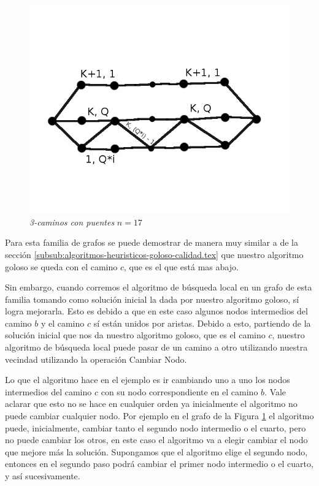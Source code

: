 \begin{figure}[H]
  \begin{center}
    \begin{minipage}{0.5\linewidth}
      \includegraphics[width=\linewidth]{graficos/grafoFamiliaRompe2.png}
      \caption{\emph{3-caminos con puentes} $n=17$}\label{fig:familia-rompe2}
    \end{minipage}
  \end{center}
\end{figure}

Para esta familia de grafos se puede demostrar de manera muy similar a de la sección \ref{subsub:algoritmos-heuristicos-goloso-calidad.tex} que nuestro algoritmo goloso se queda con el camino $c$, que es el que está mas abajo.

Sin embargo, cuando corremos el algoritmo de búsqueda local en un grafo de esta familia tomando como solución inicial la dada por nuestro algoritmo goloso, sí logra mejorarla. Esto es debido a que en este caso algunos nodos intermedios del camino $b$ y el camino $c$ sí están unidos por aristas. Debido a esto, partiendo de la solución inicial que nos da nuestro algoritmo goloso, que es el camino $c$, nuestro algoritmo de búsqueda local puede pasar de un camino a otro utilizando nuestra vecindad utilizando la operación Cambiar Nodo.

Lo que el algoritmo hace en el ejemplo es ir cambiando uno a uno los nodos intermedios del camino $c$ con su nodo correspondiente en el camino $b$. Vale aclarar que esto no se hace en cualquier orden ya inicialmente el algoritmo no puede cambiar cualquier nodo. Por ejemplo en el grafo de la Figura \ref{fig:familia-rompe2} el algoritmo puede, inicialmente, cambiar tanto el segundo nodo intermedio o el cuarto, pero no puede cambiar los otros, en este caso el algoritmo va a elegir cambiar el nodo que mejore más la solución. Supongamos que el algoritmo elige el segundo nodo, entonces en el segundo paso podrá cambiar el primer nodo intermedio o el cuarto, y así sucesivamente.
